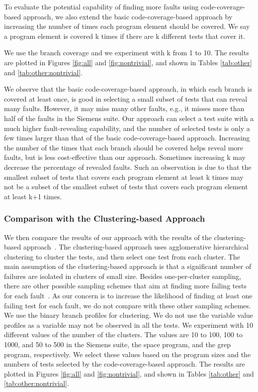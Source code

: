 \documentclass{sig-alternate}
\begin{document}
To evaluate the potential capability of finding more faults using
code-coverage-based approach, we also extend the basic
code-coverage-based approach by increasing the number of times each
program element should be covered. We say a program element is
covered k times if there are k different tests that cover it.

We use the branch coverage and we experiment with k from 1 to 10.
The results are plotted in Figures \ref{fig:all} and
\ref{fig:nontrivial}, and shown in Tables \ref{tab:other} and
\ref{tab:other:nontrivial}.

We observe that the basic code-coverage-based approach, in which
each branch is covered at least once, is good in selecting a small
subset of tests that can reveal many faults. However, it may miss
many other faults, e.g., it misses more than half of the faults in
the Siemens suite. Our approach can select a test suite with a much
higher fault-revealing capability, and the number of selected tests
is only a few times larger than that of the basic
code-coverage-based approach. Increasing the number of the times
that each branch should be covered helps reveal more faults, but is
less cost-effective than our approach. Sometimes increasing k may
decrease the percentage of revealed faults. Such an observation is
due to that the smallest subset of tests that covers each program
element at least k times may not be a subset of the smallest subset
of tests that covers each program element at least k+1 times.



\subsubsection{Comparison with the Clustering-based Approach}

We then compare the results of our approach with the results of the
clustering-based approach~\cite{Dickinson01a}. The clustering-based
approach uses agglomerative hierarchical clustering to cluster the
tests, and then select one test from each cluster. The main
assumption of the clustering-based approach is that a significant
number of failures are isolated in clusters of small size. Besides
one-per-cluster sampling, there are other possible sampling schemes
that aim at finding more failing tests for each
fault~\cite{Dickinson01b}. As our concern is to increase the
likelihood of finding at least one failing test for each fault, we
do not compare with these other sampling schemes. We use the binary
branch profiles for clustering. We do not use the variable value
profiles as a variable may not be observed in all the tests. We
experiment with 10 different values of the number of the clusters.
The values are 10 to 100, 100 to 1000, and 50 to 500 in the Siemens
suite, the space program, and the grep program, respectively. We
select these values based on the program sizes and the numbers of
tests selected by the code-coverage-based approach. The results are
plotted in Figures \ref{fig:all} and \ref{fig:nontrivial}, and shown
in Tables \ref{tab:other} and \ref{tab:other:nontrivial}.
\end{document}
